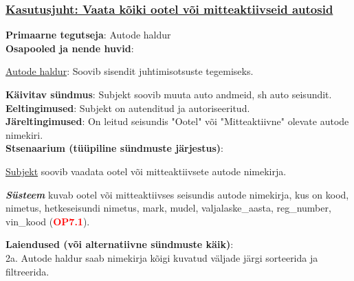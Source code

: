 \begin{shaded}
	\subsubsection{\underline{Kasutusjuht: Vaata kõiki ootel või mitteaktiivseid autosid}}
	\textbf{Primaarne tegutseja}: Autode haldur \\
	\textbf{Osapooled ja nende huvid}: 
	\useDash
	\begin{myitemize}
		\item \underline{Autode haldur}: Soovib sisendit juhtimisotsuste tegemiseks.
	\end{myitemize}
	\textbf{Käivitav sündmus}: Subjekt soovib muuta auto andmeid, sh auto seisundit. \\
	\textbf{Eeltingimused}: Subjekt on autenditud ja autoriseeritud. \\
	\textbf{Järeltingimused}: On leitud seisundis "Ootel" või "Mitteaktiivne" olevate autode nimekiri. \\
	\textbf{Stsenaarium (tüüpiline sündmuste järjestus)}:
	\begin{myenumerate}
		\item \underline{Subjekt} soovib vaadata ootel või mitteaktiivsete autode nimekirja.
		\item\textit \textbf{Süsteem} kuvab ootel või mitteaktiivses seisundis autode nimekirja, kus on kood, nimetus, hetkeseisundi nimetus, mark, mudel, valjalaske\_aasta, reg\_number, vin\_kood (\textbf{\textcolor{red}{OP7.1}}).
	\end{myenumerate}
	\textbf{Laiendused  (või alternatiivne sündmuste käik)}: \\
	\indent 2a. Autode haldur saab nimekirja kõigi kuvatud väljade järgi sorteerida ja filtreerida. \\
\end{shaded}

